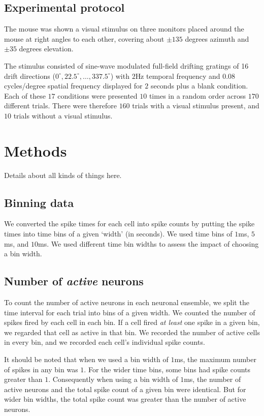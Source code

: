 \documentclass[a4paper,12pt]{article}
\theoremstyle{definition}
\begin{document}
  \subsection{Experimental protocol}
  The mouse was shown a visual stimulus on three monitors placed around the mouse at right angles to each other, covering about $\pm 135$ degrees azimuth and $\pm 35$ degrees elevation.

  The stimulus consisted of sine-wave modulated full-field drifting gratings of 16 drift directions ($0^{\circ}, 22.5^{\circ}, \dots, 337.5^{\circ}$) with $2$Hz temporal frequency and $0.08$ cycles/degree spatial frequency displayed for $2$ seconds plus a blank condition. Each of these $17$ conditions were presented $10$ times in a random order across $170$ different trials. There were therefore $160$ trials with a visual stimulus present, and $10$ trials without a visual stimulus.

\section{Methods}
Details about all kinds of things here.
    \subsection{Binning data}
    We converted the spike times for each cell into spike counts by putting the spike times into time bins of a given `width' (in seconds). We used time bins of $1$ms, $5$ms, and $10$ms. We used different time bin widths to assess the impact of choosing a bin width. 


    \subsection{Number of \textit{active} neurons}
    To count the number of active neurons in each neuronal ensemble, we split the time interval for each trial into bins of a given width. We counted the number of spikes fired by each cell in each bin. If a cell fired \textit{at least} one spike in a given bin, we regarded that cell as active in that bin. We recorded the number of active cells in every bin, and we recorded each cell's individual spike counts.
    
    It should be noted that when we used a bin width of $1$ms, the maximum number of spikes in any bin was $1$. For the wider time bins, some bins had spike counts greater than $1$. Consequently when using a bin width of $1$ms, the number of active neurons and the total spike count of a given bin were identical. But for wider bin widths, the total spike count was greater than the number of active neurons. 
\end{document}
